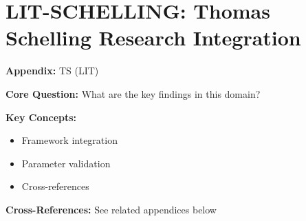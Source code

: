 \chapter{LIT-SCHELLING: Thomas Schelling Research Integration}
\label{app:lit-schelling}


\begin{tcolorbox}[colback=blue!5!white, colframe=blue!75!black,
    title=Quick Reference: Appendix TS]

\textbf{Appendix:} TS (LIT)

\textbf{Core Question:} What are the key findings in this domain?

\textbf{Key Concepts:}
\begin{itemize}[nosep]
\item Framework integration
\item Parameter validation
\item Cross-references
\end{itemize}

\textbf{Cross-References:} See related appendices below
\end{tcolorbox}

\begin{abstract}
Thomas Schelling (Nobel Prize 2005) pioneered the analysis of strategic interaction
beyond zero-sum games, introducing focal points, commitment strategies, and tipping
point dynamics. This appendix integrates his 50+ years of research on conflict
resolution, segregation dynamics, self-command, and micromotives-to-macrobehavior
aggregation into EBF. Schelling's work provides the theoretical foundation for
understanding how individual strategic choices aggregate into collective patterns,
and how context shapes coordination without explicit communication.
\end{abstract}

